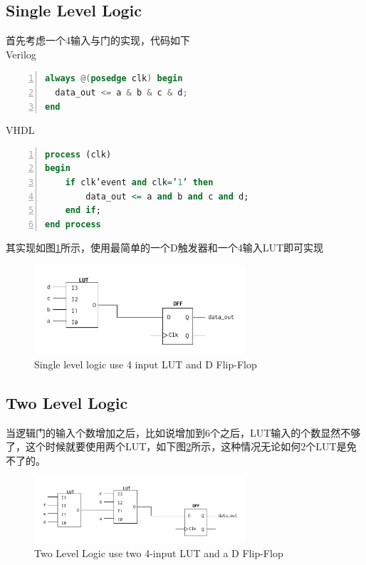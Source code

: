 \documentclass[color=green,mathpazo,titlestyle=hang,11pt]{elegantbook}
\begin{document}
\subsection{Single Level Logic}
首先考虑一个4输入与门的实现，代码如下\\
{\color{thid2}Verilog}
\begin{lstlisting}[language = Verilog, numbers=left,   
        numberstyle=\tiny,keywordstyle=\color{blue!70},  
        commentstyle=\color{red!50!green!50!blue!50},frame=shadowbox,  
        rulesepcolor=\color{red!20!green!20!blue!20},basicstyle=\ttfamily]  
always @(posedge clk) begin
  data_out <= a & b & c & d;
end
\end{lstlisting}  
{\color{thid2}VHDL}
\begin{lstlisting}[language = VHDL, numbers=left,   
        numberstyle=\tiny,keywordstyle=\color{blue!70},  
        commentstyle=\color{red!50!green!50!blue!50},frame=shadowbox,  
        rulesepcolor=\color{red!20!green!20!blue!20},basicstyle=\ttfamily]  
process (clk)
begin
	if clk’event and clk=’1’ then
		data_out <= a and b and c and d;
	end if; 
end process
\end{lstlisting} 
其实现如图\ref{Fig:SingleLevelLogic}所示，使用最简单的一个D触发器和一个4输入LUT即可实现
\begin{figure}[htbp]
	\centering
	\includegraphics[width=0.7\textwidth]{figure/SingleLevelLogic.pdf}
	\caption{Single level logic use 4 input LUT and D Flip-Flop}
	\label{Fig:SingleLevelLogic}
\end{figure}
\subsection{Two Level Logic}
当逻辑门的输入个数增加之后，比如说增加到6个之后，LUT输入的个数显然不够了，这个时候就要使用两个LUT，如下图\ref{Fig:TwoLevelLogic}所示，这种情况无论如何2个LUT是免不了的。
\begin{figure}[htbp]
	\centering
	\includegraphics[width=0.7\textwidth]{figure/TwoLevelLogic.pdf}
	\caption{Two Level Logic use two 4-input LUT and a D Flip-Flop}
	\label{Fig:TwoLevelLogic}
\end{figure}
\end{document}
